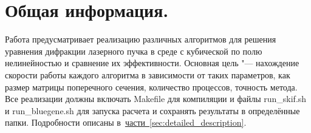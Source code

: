 \section{Общая информация.}

Работа предусматривает реализацию различных алгоритмов для решения уравнения дифракции лазерного пучка
в среде с кубической по полю нелинейностью и сравнение их эффективности.
Основная цель "--- нахождение скорости работы каждого алгоритма в зависимости от таких параметров,
как размер матрицы поперечного сечения, количество процессов, точность метода.
Все реализации должны включать Makefile для компиляции и файлы run\_skif.sh и run\_bluegene.sh для запуска расчета
и сохранять результаты в определённые папки.
Подробности описаны в~\hyperref[sec:detailed_description]{части~\ref*{sec:detailed_description}}.



